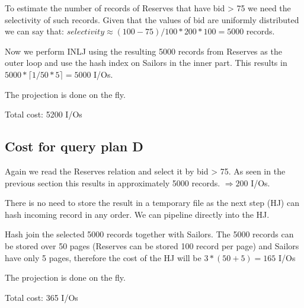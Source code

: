 \documentclass[a4paper,12pt]{article}
\begin{document}
To estimate the number of records of Reserves that have bid > 75 we need the
selectivity of such records.  Given that the values of bid are uniformly
distributed we can say that:
$ selectivity \approx (100 - 75)/100 * 200 * 100 = 5000 $ records.

Now we perform INLJ using the resulting 5000 records from Reserves as the outer
loop and use the hash index on Sailors in the inner part.  This results in
$ 5000 * \lceil 1/50 * 5 \rceil = 5000 $ I/Os.

The projection is done on the fly.

Total cost: 5200 I/Os

\subsection[Query D]{Cost for query plan D}
Again we read the Reserves relation and select it by bid > 75.  As seen in the
previous section this results in approximately 5000 records.
$ \Rightarrow 200 $ I/Os.

There is no need to store the result in a temporary file as the next step (HJ)
can hash incoming record in any order.  We can pipeline directly into the HJ.

Hash join the selected 5000 records together with Sailors.  The 5000 records
can be stored over 50 pages (Reserves can be stored 100 record per page) and
Sailors have only 5 pages, therefore the cost of the HJ will be
$ 3 * (50 + 5) = 165 $ I/Os

The projection is done on the fly.

Total cost: 365 I/Os
\end{document}
